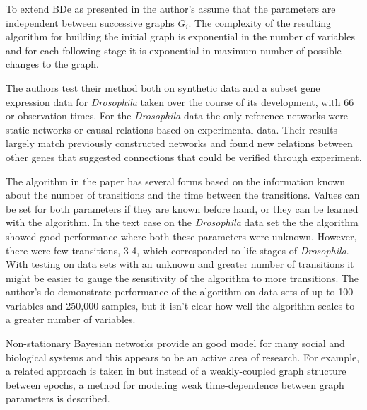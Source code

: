     To extend BDe as presented in \cite{Giovani2014} the author's
    assume that the parameters are
    independent between successive graphs $G_i$. 
    The complexity of the resulting algorithm for building the
    initial graph is exponential in the number of variables and for
    each following stage it is exponential in maximum number of
    possible changes to the graph. 

    The authors test their method both on synthetic data and 
    a subset gene expression data for \textit{Drosophila} taken
    over the course of its development, with 66
    or observation times. For the  \textit{Drosophila}
    data the only reference networks were static networks or 
    causal relations based on experimental data. Their results
    largely match previously constructed networks and found
    new relations between other genes that suggested connections
    that could be verified through experiment.  

    The algorithm in the paper has several forms based on the
    information known about the number of transitions
    and the time between the transitions. Values 
    can be set for both parameters if they are known 
    before hand, or they can be learned with the algorithm. 
    In the text case on the \textit{Drosophila} data set the
    the algorithm showed good performance where both 
    these parameters were unknown. However, 
    there were few transitions, 3-4, which corresponded
    to life stages of \textit{Drosophila}. With testing on 
    data sets with an unknown and greater number of 
    transitions it might be easier to gauge the 
    sensitivity of the algorithm to more transitions. 
    The author's do demonstrate performance of the
    algorithm on data sets of up to 100 variables and 
    250,000 samples, but it isn't clear how well the
    algorithm scales to a greater number of variables. 


    Non-stationary Bayesian networks provide an
    good model for many social and biological systems and
    this appears to be an active area of research. For 
    example, a related approach is taken in \cite{Grzegorczyk2012}
    but instead of a weakly-coupled graph structure
    between epochs, a method for modeling weak time-dependence
    between graph parameters is described. 



